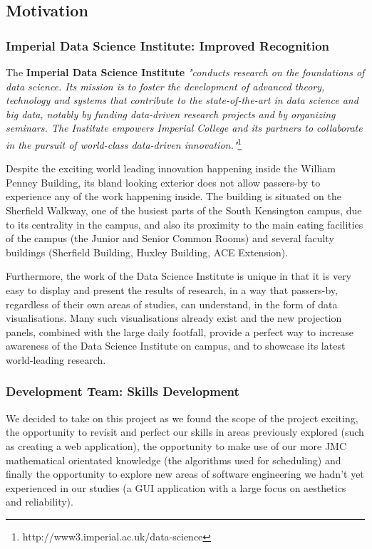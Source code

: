 \documentclass[a4paper, titlepage]{article}
\begin{document}
\subsection{Motivation}

\subsubsection{Imperial Data Science Institute: Improved Recognition}
The \textbf{Imperial Data Science Institute} \textit{"conducts research on the foundations of data science. Its mission is to foster the development of advanced theory, technology and systems that contribute to the state-of-the-art in data science and big data, notably by funding data-driven research projects and by organizing seminars. The Institute empowers Imperial College and its partners to collaborate in the pursuit of world-class data-driven innovation."}\footnote{http://www3.imperial.ac.uk/data-science}

Despite the exciting world leading innovation happening inside the William Penney Building, its bland looking exterior does not allow passers-by to experience any of the work happening inside. The building is situated on the Sherfield Walkway, one of the busiest parts of the South Kensington campus, due to its centrality in the campus, and also its proximity to the main eating facilities of the campus (the Junior and Senior Common Rooms) and several faculty buildings (Sherfield Building, Huxley Building, ACE Extension). 

Furthermore, the work of the Data Science Institute is unique in that it is very easy to display and present the results of research, in a way that passers-by, regardless of their own areas of studies, can understand, in the form of data visualisations. Many such visualisations already exist and the new projection panels, combined with the large daily footfall, provide a perfect way to increase awareness of the Data Science Institute on campus, and to showcase its latest world-leading research.

\subsubsection{Development Team: Skills Development}
We decided to take on this project as we found the scope of the project exciting, the opportunity to revisit and perfect our skills in areas previously explored (such as creating a web application), the opportunity to make use of our more JMC mathematical orientated knowledge (the algorithms used for scheduling) and finally the opportunity to explore new areas of software engineering we hadn't yet experienced in our studies (a GUI application with a large focus on aesthetics and reliability). 
\end{document}
